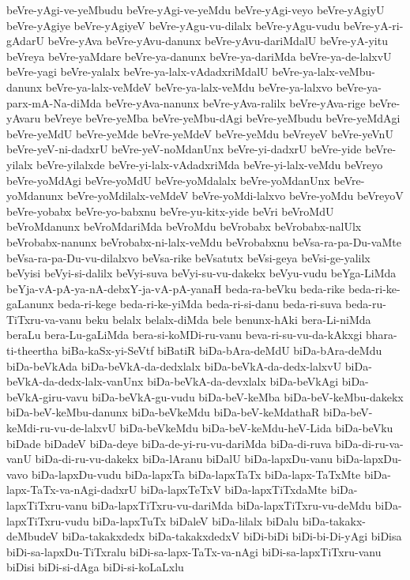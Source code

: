 {beVre-yAgi-ve-yeMbudu
beVre-yAgi-ve-yeMdu
beVre-yAgi-veyo
beVre-yAgiyU
beVre-yAgiye
beVre-yAgiyeV
beVre-yAgu-vu-dilalx
beVre-yAgu-vudu
beVre-yA-ri-gAdarU
beVre-yAva
beVre-yAvu-danunx
beVre-yAvu-dariMdalU
beVre-yA-yitu
beVreya
beVre-yaMdare
beVre-ya-danunx
beVre-ya-dariMda
beVre-ya-de-lalxvU
beVre-yagi
beVre-yalalx
beVre-ya-lalx-vAdadxriMdalU
beVre-ya-lalx-veMbu-danunx
beVre-ya-lalx-veMdeV
beVre-ya-lalx-veMdu
beVre-ya-lalxvo
beVre-ya-parx-mA-Na-diMda
beVre-yAva-nanunx
beVre-yAva-ralilx
beVre-yAva-rige
beVre-yAvaru
beVreye
beVre-yeMba
beVre-yeMbu-dAgi
beVre-yeMbudu
beVre-yeMdAgi
beVre-yeMdU
beVre-yeMde
beVre-yeMdeV
beVre-yeMdu
beVreyeV
beVre-yeVnU
beVre-yeV-ni-dadxrU
beVre-yeV-noMdanUnx
beVre-yi-dadxrU
beVre-yide
beVre-yilalx
beVre-yilalxde
beVre-yi-lalx-vAdadxriMda
beVre-yi-lalx-veMdu
beVreyo
beVre-yoMdAgi
beVre-yoMdU
beVre-yoMdalalx
beVre-yoMdanUnx
beVre-yoMdanunx
beVre-yoMdilalx-veMdeV
beVre-yoMdi-lalxvo
beVre-yoMdu
beVreyoV
beVre-yobabx
beVre-yo-babxnu
beVre-yu-kitx-yide
beVri
beVroMdU
beVroMdanunx
beVroMdariMda
beVroMdu
beVrobabx
beVrobabx-nalUlx
beVrobabx-nanunx
beVrobabx-ni-lalx-veMdu
beVrobabxnu
beVsa-ra-pa-Du-vaMte
beVsa-ra-pa-Du-vu-dilalxvo
beVsa-rike
beVsatutx
beVsi-geya
beVsi-ge-yalilx
beVyisi
beVyi-si-dalilx
beVyi-suva
beVyi-su-vu-dakekx
beVyu-vudu
beYga-LiMda
beYja-vA-pA-ya-nA-debxY-ja-vA-pA-yanaH
beda-ra-beVku
beda-rike
beda-ri-ke-gaLanunx
beda-ri-kege
beda-ri-ke-yiMda
beda-ri-si-danu
beda-ri-suva
beda-ru-TiTxru-va-vanu
beku
belalx
belalx-diMda
bele
benunx-hAki
bera-Li-niMda
beraLu
bera-Lu-gaLiMda
bera-si-koMDi-ru-vanu
beva-ri-su-vu-da-kAkxgi
bhara-ti-theertha
biBa-kaSx-yi-SeVtf
biBatiR
biDa-bAra-deMdU
biDa-bAra-deMdu
biDa-beVkAda
biDa-beVkA-da-dedxlalx
biDa-beVkA-da-dedx-lalxvU
biDa-beVkA-da-dedx-lalx-vanUnx
biDa-beVkA-da-devxlalx
biDa-beVkAgi
biDa-beVkA-giru-vavu
biDa-beVkA-gu-vudu
biDa-beV-keMba
biDa-beV-keMbu-dakekx
biDa-beV-keMbu-danunx
biDa-beVkeMdu
biDa-beV-keMdathaR
biDa-beV-keMdi-ru-vu-de-lalxvU
biDa-beVkeMdu
biDa-beV-keMdu-heV-Lida
biDa-beVku
biDade
biDadeV
biDa-deye
biDa-de-yi-ru-vu-dariMda
biDa-di-ruva
biDa-di-ru-va-vanU
biDa-di-ru-vu-dakekx
biDa-lAranu
biDalU
biDa-lapxDu-vanu
biDa-lapxDu-vavo
biDa-lapxDu-vudu
biDa-lapxTa
biDa-lapxTaTx
biDa-lapx-TaTxMte
biDa-lapx-TaTx-va-nAgi-dadxrU
biDa-lapxTeTxV
biDa-lapxTiTxdaMte
biDa-lapxTiTxru-vanu
biDa-lapxTiTxru-vu-dariMda
biDa-lapxTiTxru-vu-deMdu
biDa-lapxTiTxru-vudu
biDa-lapxTuTx
biDaleV
biDa-lilalx
biDalu
biDa-takakx-deMbudeV
biDa-takakxdedx
biDa-takakxdedxV
biDi-biDi
biDi-bi-Di-yAgi
biDisa
biDi-sa-lapxDu-TiTxralu
biDi-sa-lapx-TaTx-va-nAgi
biDi-sa-lapxTiTxru-vanu
biDisi
biDi-si-dAga
biDi-si-koLaLxlu
}
